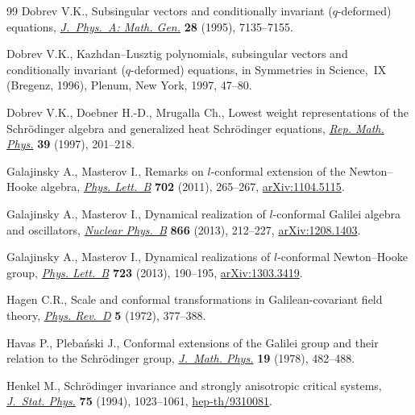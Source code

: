 \documentclass[pdftex]{sigma}
\numberwithin{equation}{section}
\begin{document}
\begin{thebibliography}{99}
Dobrev V.K., Subsingular vectors and conditionally invariant ({$q$}-deformed) equations,
\href{http://dx.doi.org/10.1088/0305-4470/28/24/014}{\textit{J.~Phys.~A: Math. Gen.}} \textbf{28} (1995), 7135--7155.

Dobrev V.K., Kazhdan--{L}usztig polynomials, subsingular vectors and conditionally invariant ({$q$}-deformed) equations,
in Symmetries in Science,~{IX} ({B}regenz, 1996), Plenum, New York, 1997, 47--80.

Dobrev V.K., Doebner H.-D., Mrugalla Ch., Lowest weight representations of the {S}chr\"odinger algebra and generalized
heat {S}chr\"odinger equations, \href{http://dx.doi.org/10.1016/S0034-4877(97)88001-9}{\textit{Rep. Math. Phys.}} \textbf{39} (1997), 201--218.

Galajinsky A., Masterov I., Remarks on {$l$}-conformal extension of the {N}ewton--{H}ooke algebra,
\href{http://dx.doi.org/10.1016/j.physletb.2011.06.093}{\textit{Phys. Lett.~B}} \textbf{702} (2011), 265--267, \href{http://arxiv.org/abs/1104.5115}{arXiv:1104.5115}.

Galajinsky A., Masterov I., Dynamical realization of {$l$}-conformal {G}alilei algebra and oscillators,
\href{http://dx.doi.org/10.1016/j.nuclphysb.2012.09.004}{\textit{Nuclear Phys.~B}} \textbf{866} (2013), 212--227,
\href{http://arxiv.org/abs/1208.1403}{arXiv:1208.1403}.

Galajinsky A., Masterov I., Dynamical realizations of {$l$}-conformal {N}ewton--{H}ooke group,
\href{http://dx.doi.org/10.1016/j.physletb.2013.04.054}{\textit{Phys. Lett.~B}} \textbf{723} (2013), 190--195, \href{http://arxiv.org/abs/1303.3419}{arXiv:1303.3419}.

Hagen C.R., Scale and conformal transformations in Galilean-covariant f\/ield theory,
\href{http://dx.doi.org/10.1103/PhysRevD.5.377}{\textit{Phys. Rev.~D}} \textbf{5} (1972), 377--388.

Havas P., Pleba{\'n}ski J., Conformal extensions of the {G}alilei group and their relation to the {S}chr\"odinger group,
\href{http://dx.doi.org/10.1063/1.523670}{\textit{J.~Math. Phys.}} \textbf{19} (1978), 482--488.

Henkel M., Schr\"odinger invariance and strongly anisotropic critical systems,
\href{http://dx.doi.org/10.1007/BF02186756}{\textit{J.~Stat. Phys.}} \textbf{75} (1994), 1023--1061, \href{http://arxiv.org/abs/hep-th/9310081}{hep-th/9310081}.


\end{thebibliography}
\end{document}
